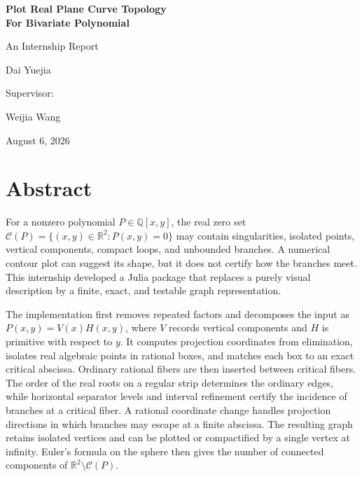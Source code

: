 \documentclass[11pt,a4paper]{article}
\newcommand{\ReportTitle}{Plot Real Plane Curve Topology\\For Bivariate Polynomial}
\newcommand{\ReportSubtitle}{An Internship Report}
\newcommand{\ReportAuthor}{Dai Yuejia}
\newcommand{\ReportSupervisor}{Weijia Wang}
\newcommand{\ReportDate}{August 6, 2026}
\newcommand{\QQ}{\mathbb{Q}}
\newcommand{\RR}{\mathbb{R}}
\newcommand{\Curve}{\mathcal{C}}
\begin{document}

\begin{titlepage}
  \thispagestyle{empty}
  \centering
  \vspace*{0.20\textheight}
  {\fontsize{21}{26}\selectfont\bfseries \ReportTitle\par}
  \vspace{1.35em}
  {\Large \ReportSubtitle\par}

  \vspace{5.2em}
  {\Large \ReportAuthor\par}

  \vspace{3.0em}
  {\large Supervisor:\par}
  \vspace{0.7em}
  {\Large \ReportSupervisor\par}

  \vfill
  {\large \ReportDate\par}
\end{titlepage}

\setcounter{page}{1}
\section*{Abstract}

For a nonzero polynomial $P\in\QQ[x,y]$, the real zero set
$\Curve(P)=\{(x,y)\in\RR^2:P(x,y)=0\}$ may contain singularities, isolated
points, vertical components, compact loops, and unbounded branches. A numerical
contour plot can suggest its shape, but it does not certify how the branches
meet. This internship developed a Julia package that replaces a purely visual
description by a finite, exact, and testable graph representation.

The implementation first removes repeated factors and decomposes the input as
$P(x,y)=V(x)H(x,y)$, where $V$ records vertical components and $H$ is primitive
with respect to $y$. It computes projection coordinates from elimination,
isolates real algebraic points in rational boxes, and matches each box to an
exact critical abscissa. Ordinary rational fibers are then inserted between
critical fibers. The order of the real roots on a regular strip determines the
ordinary edges, while horizontal separator levels and interval refinement
certify the incidence of branches at a critical fiber. A rational coordinate
change handles projection directions in which branches may escape at a finite
abscissa. The resulting graph retains isolated vertices and can be plotted or
compactified by a single vertex at infinity. Euler's formula on the sphere then
gives the number of connected components of
$\RR^2\setminus\Curve(P)$.
\end{document}
